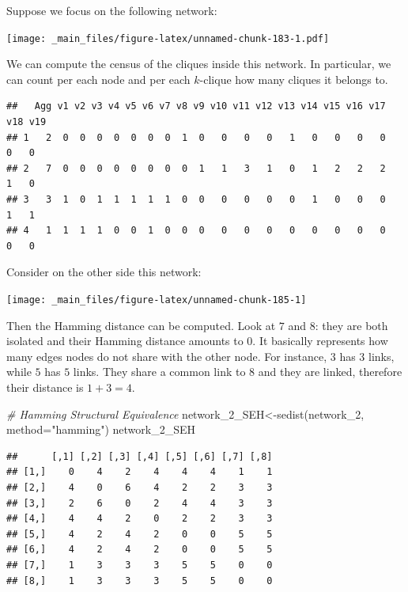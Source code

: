 \documentclass[
  notitlepage,
  onecolumn,
  openany]{book}
\newenvironment{Shaded}{\begin{snugshade}}{\end{snugshade}}
\newcommand{\AttributeTok}[1]{\textcolor[rgb]{0.77,0.63,0.00}{#1}}
\newcommand{\CommentTok}[1]{\textcolor[rgb]{0.56,0.35,0.01}{\textit{#1}}}
\newcommand{\FunctionTok}[1]{\textcolor[rgb]{0.00,0.00,0.00}{#1}}
\newcommand{\NormalTok}[1]{#1}
\newcommand{\OtherTok}[1]{\textcolor[rgb]{0.56,0.35,0.01}{#1}}
\newcommand{\SpecialCharTok}[1]{\textcolor[rgb]{0.00,0.00,0.00}{#1}}
\newcommand{\StringTok}[1]{\textcolor[rgb]{0.31,0.60,0.02}{#1}}
\begin{document}
Suppose we focus on the following network:

\texttt{[image: \_main\_files/figure-latex/unnamed-chunk-183-1.pdf]}

We can compute the census of the cliques inside this network. In particular, we can count per each node and per each \(k\)-clique how many cliques it belongs to.

\begin{Shaded}
\end{Shaded}

\begin{verbatim}
##   Agg v1 v2 v3 v4 v5 v6 v7 v8 v9 v10 v11 v12 v13 v14 v15 v16 v17 v18 v19
## 1   2  0  0  0  0  0  0  0  1  0   0   0   0   1   0   0   0   0   0   0
## 2   7  0  0  0  0  0  0  0  0  1   1   3   1   0   1   2   2   2   1   0
## 3   3  1  0  1  1  1  1  1  0  0   0   0   0   0   1   0   0   0   1   1
## 4   1  1  1  1  0  0  1  0  0  0   0   0   0   0   0   0   0   0   0   0
\end{verbatim}

Consider on the other side this network:

\texttt{[image: \_main\_files/figure-latex/unnamed-chunk-185-1]}

Then the Hamming distance can be computed. Look at \(7\) and \(8\): they are both isolated and their Hamming distance amounts to 0. It basically represents how many edges nodes do not share with the other node. For instance, \(3\) has 3 links, while \(5\) has \(5\) links. They share a common link to \(8\) and they are linked, therefore their distance is \(1+3 = 4\).

\begin{Shaded}
\begin{Highlighting}[]
\CommentTok{\# Hamming Structural Equivalence}
\NormalTok{network\_2\_SEH}\OtherTok{\textless{}{-}}\FunctionTok{sedist}\NormalTok{(network\_2, }\AttributeTok{method=}\StringTok{"hamming"}\NormalTok{)}
\NormalTok{network\_2\_SEH}
\end{Highlighting}
\end{Shaded}

\begin{verbatim}
##      [,1] [,2] [,3] [,4] [,5] [,6] [,7] [,8]
## [1,]    0    4    2    4    4    4    1    1
## [2,]    4    0    6    4    2    2    3    3
## [3,]    2    6    0    2    4    4    3    3
## [4,]    4    4    2    0    2    2    3    3
## [5,]    4    2    4    2    0    0    5    5
## [6,]    4    2    4    2    0    0    5    5
## [7,]    1    3    3    3    5    5    0    0
## [8,]    1    3    3    3    5    5    0    0
\end{verbatim}
\end{document}
